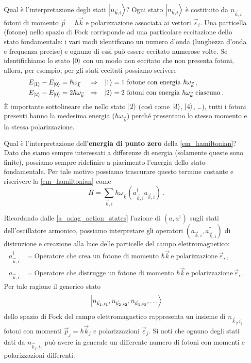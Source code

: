\noindent Qual è l'interpretazione degli stati $\ket{n_{\vec{k},i}}$? Ogni stato $\ket{n_{\vec{k},i}}$ è costituito da $n_{\vec{k},i}$ fotoni di momento $\vec{p} = \hbar \vec{k}$ e polarizzazione associata ai vettori $\vec{\varepsilon}_i$. Una particella (fotone) nello spazio di Fock corrisponde ad una particolare eccitazione dello stato fondamentale: i vari modi identificano un numero d'onda (lunghezza d'onda e frequenza precise) e ognuno di essi può essere eccitato numerose volte. Se identifichiamo lo stato $\ket{0}$ con un modo non eccitato che non presenta fotoni, allora, per esempio, per gli stati eccitati possiamo scrivere
\begin{align*}
    E_{\ket{1}} - E_{\ket{0}} &= \hbar \omega_{\vec{k}} &\Rightarrow& &\ket{1} &= \text{1 fotone con energia } \hbar \omega_{\vec{k}} \, , \\
    E_{\ket{2}} - E_{\ket{0}} &= 2 \hbar \omega_{\vec{k}} &\Rightarrow& &\ket{2} &= \text{2 fotoni con energia } \hbar \omega_{\vec{k}} \text{ ciascuno} \, .
\end{align*}
È importante sottolineare che nello stato $\ket{2}$ (così come $\ket{3}$, $\ket{4}$, \dots), tutti i fotoni presenti hanno la medesima energia ($\hbar \omega_{\vec{k}}$) perché presentano lo stesso momento e la stessa polarizzazione. 

\noindent Qual è l'interpretazione dell'\textbf{energia di punto zero} della \eqref{em_hamiltonian}? Dato che siamo sempre interessati a differenze di energia (solamente queste sono finite), possiamo sempre ridefinire a piacimento l'energia dello stato fondamentale. Per tale motivo possiamo trascurare questo termine costante e riscrivere la \eqref{em_hamiltonian} come 
\begin{equation*}
    H = \sum_{\vec{k},i} \hbar \omega_{\vec{k}} \left( a^{\dag}_{\vec{k},i} a_{\vec{k},i} \right) \, .
\end{equation*}

\noindent Ricordando dalle \eqref{a_adag_action_states} l'azione di $(a,a^\dag)$ sugli stati dell'oscillatore armonico, possiamo interpretare gli operatori $(a_{\vec{k},i}, a^\dag_{\vec{k},i})$ di distruzione e creazione alla luce delle particelle del campo elettromagnetico:
\begin{align*}
    a^\dag_{\vec{k},i} &= \text{Operatore che crea un fotone di momento } \hbar \vec{k} \, \text{e polarizzazione} \, \vec{\varepsilon}_i \, , \\
    a_{\vec{k},i} &= \text{Operatore che distrugge un fotone di momento } \hbar \vec{k}\, \text{e polarizzazione} \, \vec{\varepsilon}_i \, .
\end{align*}
Per tale ragione il generico stato 
\begin{equation*}
    \ket{n_{\vec{k}_1, i_1}, n_{\vec{k}_2, i_2}, n_{\vec{k}_3, i_3}, \ldots}
\end{equation*}
dello spazio di Fock del campo elettromagnetico rappresenta un insieme di $n_{\vec{k}_j, i_j}$ fotoni con momenti $\vec{p}_j = \hbar \vec{k}_j$ e polarizzazioni $\vec{\varepsilon}_j$. Si noti che ognuno degli stati dati da $n_{\vec{k}_j, i_j}$ può avere in generale un differente numero di fotoni con momenti e polarizzazioni differenti.

